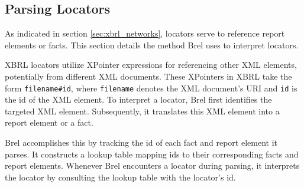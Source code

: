 

\subsection{Parsing Locators}

As indicated in section \ref{sec:xbrl_networks}, locators serve to reference report elements or facts.
This section details the method Brel uses to interpret locators.

XBRL locators utilize XPointer\cite{w3_xpointer} expressions for referencing other XML elements, potentially from different XML documents.
These XPointers in XBRL take the form \texttt{filename\#id},
where \texttt{filename} denotes the XML document's URI and \texttt{id} is the id of the XML element.
To interpret a locator, Brel first identifies the targeted XML element.
Subsequently, it translates this XML element into a report element or a fact.

Brel accomplishes this by tracking the id of each fact and report element it parses.
It constructs a lookup table mapping ids to their corresponding facts and report elements.
Whenever Brel encounters a locator during parsing, it interprets the locator by consulting the lookup table with the locator's id.

  

